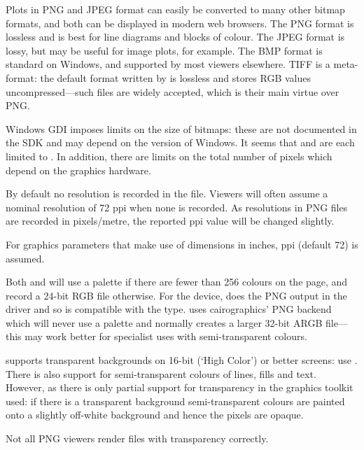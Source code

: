 %
\begin{Details}\relax
  
Plots in PNG and JPEG format can easily be converted to many other
bitmap formats, and both can be displayed in modern web browsers.  The
PNG format is lossless and is best for line diagrams and blocks of
colour.  The JPEG format is lossy, but may be useful for image plots,
for example.  The BMP format is standard on Windows, and supported by
most viewers elsewhere.  TIFF is a meta-format: the default format
written by  is lossless and stores RGB values
uncompressed---such files are widely accepted, which is their main
virtue over PNG.

Windows GDI imposes limits on the size of bitmaps: these are not
documented in the SDK and may depend on the version of Windows.
It seems that  and  are each limited to
.  In addition, there are limits on the total
number of pixels which depend on the graphics hardware.

By default no resolution is recorded in the file.  Viewers will often
assume a nominal resolution of 72 ppi when none is recorded.  As
resolutions in PNG files are recorded in pixels/metre, the reported
ppi value will be changed slightly.

For graphics parameters that make use of dimensions in inches,
 ppi (default 72) is assumed.

Both  and  will use a palette if there are fewer
than 256 colours on the page, and record a 24-bit RGB file otherwise.
For the  device,  does the PNG output in
the driver and so is compatible with the  type.
 uses cairographics' PNG backend which will
never use a palette and normally creates a larger 32-bit ARGB
file---this may work better for specialist uses with semi-transparent
colours.

 supports transparent backgrounds on 16-bit
(`High Color') or better screens: use .  There is also support for semi-transparent colours
of lines, fills and text.  However, as there is only partial support
for transparency in the graphics toolkit used: if there is a
transparent background semi-transparent colours are painted onto a
slightly off-white background and hence the pixels are opaque.

Not all PNG viewers render files with transparency correctly.
\end{Details}
